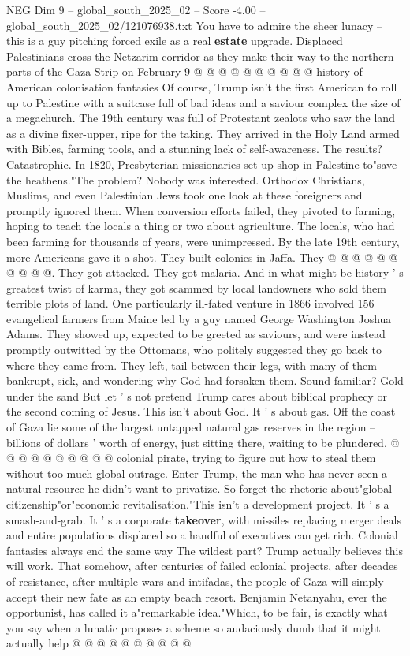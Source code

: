 \begin{textsample}{NEG Dim 9 – global\_south\_2025\_02 – Score -4.00 – global\_south\_2025\_02/121076938.txt}
You have to admire the sheer lunacy -- this is a guy pitching forced exile as a real \textbf{estate} upgrade.
Displaced Palestinians cross the Netzarim corridor as they make their way to the northern parts of the Gaza Strip on February 9 @ @ @ @ @ @ @ @ @ @ history of American colonisation fantasies Of course, Trump isn't the first American to roll up to Palestine with a suitcase full of bad ideas and a saviour complex the size of a megachurch.
The 19th century was full of Protestant zealots who saw the land as a divine fixer-upper, ripe for the taking.
They arrived in the Holy Land armed with Bibles, farming tools, and a stunning lack of self-awareness.
The results?
Catastrophic.
In 1820, Presbyterian missionaries set up shop in Palestine to"save the heathens."The problem?
Nobody was interested.
Orthodox Christians, Muslims, and even Palestinian Jews took one look at these foreigners and promptly ignored them.
When conversion efforts failed, they pivoted to farming, hoping to teach the locals a thing or two about agriculture.
The locals, who had been farming for thousands of years, were unimpressed.
By the late 19th century, more Americans gave it a shot.
They built colonies in Jaffa.
They @ @ @ @ @ @ @ @ @ @.
They got attacked.
They got malaria.
And in what might be history ' s greatest twist of karma, they got scammed by local landowners who sold them terrible plots of land.
One particularly ill-fated venture in 1866 involved 156 evangelical farmers from Maine led by a guy named George Washington Joshua Adams.
They showed up, expected to be greeted as saviours, and were instead promptly outwitted by the Ottomans, who politely suggested they go back to where they came from.
They left, tail between their legs, with many of them bankrupt, sick, and wondering why God had forsaken them.
Sound familiar?
Gold under the sand But let ' s not pretend Trump cares about biblical prophecy or the second coming of Jesus.
This isn't about God.
It ' s about gas.
Off the coast of Gaza lie some of the largest untapped natural gas reserves in the region -- billions of dollars ' worth of energy, just sitting there, waiting to be plundered. @ @ @ @ @ @ @ @ @ @ colonial pirate, trying to figure out how to steal them without too much global outrage.
Enter Trump, the man who has never seen a natural resource he didn't want to privatize.
So forget the rhetoric about"global citizenship"or"economic revitalisation."This isn't a development project.
It ' s a smash-and-grab.
It ' s a corporate \textbf{takeover}, with missiles replacing merger deals and entire populations displaced so a handful of executives can get rich.
Colonial fantasies always end the same way The wildest part?
Trump actually believes this will work.
That somehow, after centuries of failed colonial projects, after decades of resistance, after multiple wars and intifadas, the people of Gaza will simply accept their new fate as an empty beach resort.
Benjamin Netanyahu, ever the opportunist, has called it a"remarkable idea."Which, to be fair, is exactly what you say when a lunatic proposes a scheme so audaciously dumb that it might actually help @ @ @ @ @ @ @ @ @ @

\end{textsample}
